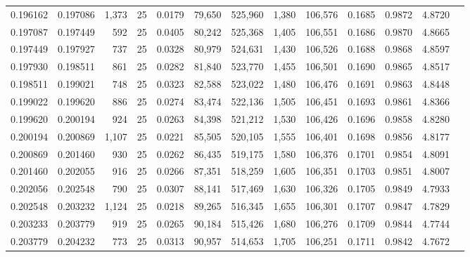 \begin{tabular}{rrrrrrrrrrrrr}
0.196162 & 0.197086 & 1,373 &  25 &                                     0.0179 &  79,650 & 525,960 &   1,380 & 106,576 & 0.1685 & 0.9872 & 4.8720 \\
0.197087 & 0.197449 &   592 &  25 &                                     0.0405 &  80,242 & 525,368 &   1,405 & 106,551 & 0.1686 & 0.9870 & 4.8665 \\
0.197449 & 0.197927 &   737 &  25 &                                     0.0328 &  80,979 & 524,631 &   1,430 & 106,526 & 0.1688 & 0.9868 & 4.8597 \\
0.197930 & 0.198511 &   861 &  25 &                                     0.0282 &  81,840 & 523,770 &   1,455 & 106,501 & 0.1690 & 0.9865 & 4.8517 \\
0.198511 & 0.199021 &   748 &  25 &                                     0.0323 &  82,588 & 523,022 &   1,480 & 106,476 & 0.1691 & 0.9863 & 4.8448 \\
0.199022 & 0.199620 &   886 &  25 &                                     0.0274 &  83,474 & 522,136 &   1,505 & 106,451 & 0.1693 & 0.9861 & 4.8366 \\
0.199620 & 0.200194 &   924 &  25 &                                     0.0263 &  84,398 & 521,212 &   1,530 & 106,426 & 0.1696 & 0.9858 & 4.8280 \\
0.200194 & 0.200869 & 1,107 &  25 &                                     0.0221 &  85,505 & 520,105 &   1,555 & 106,401 & 0.1698 & 0.9856 & 4.8177 \\
0.200869 & 0.201460 &   930 &  25 &                                     0.0262 &  86,435 & 519,175 &   1,580 & 106,376 & 0.1701 & 0.9854 & 4.8091 \\
0.201460 & 0.202055 &   916 &  25 &                                     0.0266 &  87,351 & 518,259 &   1,605 & 106,351 & 0.1703 & 0.9851 & 4.8007 \\
0.202056 & 0.202548 &   790 &  25 &                                     0.0307 &  88,141 & 517,469 &   1,630 & 106,326 & 0.1705 & 0.9849 & 4.7933 \\
0.202548 & 0.203232 & 1,124 &  25 &                                     0.0218 &  89,265 & 516,345 &   1,655 & 106,301 & 0.1707 & 0.9847 & 4.7829 \\
0.203233 & 0.203779 &   919 &  25 &                                     0.0265 &  90,184 & 515,426 &   1,680 & 106,276 & 0.1709 & 0.9844 & 4.7744 \\
0.203779 & 0.204232 &   773 &  25 &                                     0.0313 &  90,957 & 514,653 &   1,705 & 106,251 & 0.1711 & 0.9842 & 4.7672 \\

\end{tabular}

